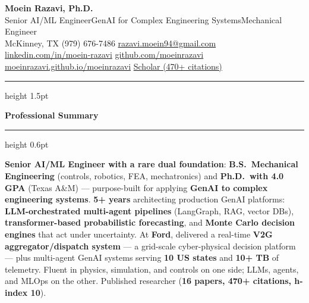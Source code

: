 \documentclass[10.5pt,letterpaper]{article}
\newcommand{\gsep}{\enspace{\color{goldaccent}\bfseries\textperiodcentered}\enspace}
\newcommand{\cvsection}[1]{%
  \vspace{0.18em}%
  {\color{headerblue}\large\bfseries #1}%
  \vspace{0.06em}%
  {\color{goldaccent}\hrule height 0.6pt}%
  \vspace{0.18em}%
}
\begin{document}
\begin{center}
  {\fontsize{20}{24}\selectfont\bfseries\color{headerblue}Moein Razavi, Ph.D.}\\[0.2em]
  {\color{darktext}\large
    Senior AI/ML Engineer\gsep GenAI for Complex Engineering Systems\gsep Mechanical Engineer
  }\\[0.3em]
  {\color{graytext}
    McKinney, TX\gsep
    (979) 676-7486\gsep
    \href{mailto:razavi.moein94@gmail.com}{razavi.moein94@gmail.com}
  }\\[0.15em]
  {\color{graytext}
    \href{https://linkedin.com/in/moein-razavi}{linkedin.com/in/moein-razavi}\gsep
    \href{https://github.com/moeinrazavi}{github.com/moeinrazavi}\gsep
    \href{https://moeinrazavi.github.io/moeinrazavi/}{moeinrazavi.github.io/moeinrazavi}\gsep
    {\color{accentcolor}\href{https://scholar.google.com/citations?user=wj_qWaQAAAAJ}{Scholar (470+ citations)}}
  }
\end{center}

\vspace{0.12em}
{\color{goldaccent}\hrule height 1.5pt}
\vspace{0.22em}

\cvsection{Professional Summary}

{\color{darktext}
\textbf{Senior AI/ML Engineer with a rare dual foundation}: \textbf{B.S.\ Mechanical Engineering} (controls, robotics, FEA, mechatronics) and \textbf{Ph.D.\ with 4.0 GPA} (Texas A\&M) --- purpose-built for applying \textbf{GenAI to complex engineering systems}. \textbf{5+ years} architecting production GenAI platforms: \textbf{LLM-orchestrated multi-agent pipelines} (LangGraph, RAG, vector DBs), \textbf{transformer-based probabilistic forecasting}, and \textbf{Monte Carlo decision engines} that act under uncertainty. At \textbf{Ford}, delivered a real-time \textbf{V2G aggregator/dispatch system} --- a grid-scale cyber-physical decision platform --- plus multi-agent GenAI systems serving \textbf{10 US states} and \textbf{10+ TB} of telemetry. Fluent in physics, simulation, and controls on one side; LLMs, agents, and MLOps on the other. Published researcher (\textbf{16 papers, 470+ citations, h-index 10}).
}
\end{document}
